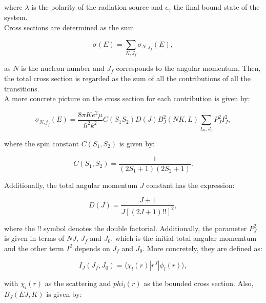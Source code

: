 \documentclass[openany]{book}
\begin{document}
where $\lambda$ is the polarity of the radiation source and $\epsilon_\gamma$ the final bound state of the system. \\



Cross sections are determined as the sum 


\begin{equation}\label{eq:potential_radiativeCrossSections}
	\sigma(E) = \sum_{N, J_f} \sigma_{N, j_f} (E),
\end{equation}

as $N$ is the nucleon number and $J_f$ corresponds to the angular momentum. Then, the total cross section is regarded as the sum of all the contributions of all the transitions.\\

A more concrete picture on the cross section for each contribution is given by: 

\begin{equation}\label{eq:potential_radiativeCrossSections_each}
	 \sigma_{N, j_f} (E) = \frac{8\pi K e^2 \mu}{\hbar^2 k^2} C(S_1 S_2) D(J) B^2_J(NK, L) \sum_{L_0, J_0} P^2_{J} I^2_{J} ,
\end{equation}

where the spin constant $C(S_1, S_2)$ is given by: 

\begin{equation}\label{eq:potential_radiativeCrossSections_spinConstant}
	C(S_1, S_2) = \frac{1}{(2S_1 + 1)(2S_2 + 1)}.
\end{equation}

Additionally, the total angular momentum $J$ constant has the expression:

\begin{equation}\label{eq:potential_radiativeCrossSections_JConstant}
	D(J) = \frac{J+1}{J[(2J + 1)!!]^2},
\end{equation}

where the !! symbol denotes the double factorial. Additionally, the parameter $P^2_{J}$ is given in terms of $NJ$, $J_f$ and $J_0$, which is the initial total angular momemtum and the other term $I^2$ depends on $J_f$ and $J_0$. More concretely, they are defined as:

\begin{equation}\label{eq:potential_radiativeCrossSections_Iintegral}
	I_J(J_f, J_0) = 	\langle\chi_l(r) | r^J| \phi_l(r) \rangle,
\end{equation}

with $\chi_l(r) $ as the scattering and $phi_l(r) $ as the bounded cross section. Also, $B_J(EJ, K)$ is given by:
\end{document}
